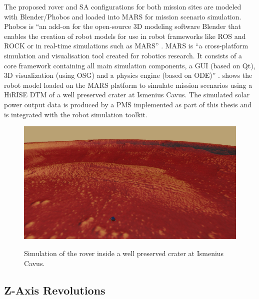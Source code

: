 The proposed rover and \ac{SA} configurations for both mission sites are modeled with Blender/Phobos and loaded into MARS for mission scenario simulation. Phobos is ``an add-on for the open-source 3D modeling software Blender that enables the creation of robot models for use in robot frameworks like ROS and ROCK or in real-time simulations such as MARS'' . MARS is ``a cross-platform simulation and visualisation tool created for robotics research. It consists of a core framework containing all main simulation components, a GUI (based on Qt), 3D visualization (using OSG) and a physics engine (based on ODE)'' .  shows the robot model loaded on the MARS platform to simulate mission scenarios using a \ac{HiRISE} \ac{DTM} of a well preserved crater at Ismenius Cavus. The simulated solar power output data is produced by a \ac{PMS} implemented as part of this thesis and is integrated with the robot simulation toolkit.

\vspace{0.2cm}

\begin{figure}[h]
  \captionsetup[subfigure]{justification=centering}
  \centering
  \hypersetup{linkcolor=captionTextColor}
  \includegraphics[width=0.9\linewidth]{sections/design/simulation/images/mars-sim-ismenius-cavus.png}\\
  \caption[Simulation of the rover inside a well preserved crater at Ismenius Cavus]
          {Simulation of the rover inside a well preserved crater at Ismenius Cavus.}
  \label{fig:simulated-mission-site-ismenius-cavus}
\end{figure}

\subsection{Z-Axis Revolutions}


